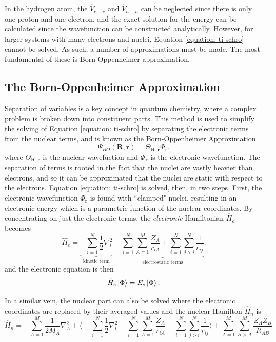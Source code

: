 In the hydrogen atom, the $\hat{V}_{e-e}$ and $\hat{V}_{n-n}$ can be neglected since there is only one proton and one electron, and the exact solution for the energy can be calculated since the wavefunction can be constructed analytically. However, for larger systems with many electrons and nuclei, Equation \ref{equation: ti-schro} cannot be solved. As such, a number of approximations must be made. The most fundamental of these is Born-Oppenheimer approximation.
\subsection{The Born-Oppenheimer Approximation}\label{section: QM_bornoppenheimer}
Separation of variables is a key concept in quantum chemistry, where a complex problem is broken down into constituent parts. This method is used to simplify the solving of Equation \ref{equation: ti-schro} by separating the electronic terms from the nuclear terms, and is known as the Born-Oppenheimer Approximation\cite{Born1927}
\begin{equation}
    \Psi_{BO}(\bm{R},\bm{r})=\Theta_{\bm{R},\bm{r}}\Phi_{\bm{r}}.
\end{equation}
where $\Theta_{\bm{R},\bm{r}}$ is the nuclear wavefuction and $\Phi_{\bm{r}}$ is the electronic wavefunction. The separation of terms is rooted in the fact that the nuclei are vastly heavier than electrons, and so it can be approximated that the nuclei are static with respect to the electrons. Equation \ref{equation: ti-schro} is solved, then, in two steps. First, the electronic wavefunction $\Phi_{\bm{r}}$ is found with ``clamped" nuclei, resulting in an electronic energy which is a parametric function of the nuclear coordinates. By concentrating on just the electronic terms, the \textit{electronic} Hamiltonian $\hat{H}_{e}$ becomes
\begin{equation}\label{equation: Hel}
     \hat{H}_{e}=\underbrace{-\sum_{i=1}^{N}\frac{1}{2}\nabla_{i}^2}_\text{kinetic term}-\underbrace{\sum_{i=1}^{N}\sum_{A=1}^{M}\frac{Z_{A}}{r_{iA}}+\sum_{i=1}^{N}\sum_{j>{i}}^{N}\frac{1}{r_{ij}}}_\text{electrostatic terms}.
\end{equation}
and the electronic \schro{} equation is then
\begin{equation}\label{equation: ti-schro-el}
   \hat{H}_{e}\ket{\Phi}=E_{e}\ket{\Phi}.
\end{equation}

In a similar vein, the nuclear part can also be solved where the electronic coordinates are replaced by their averaged values and the nuclear Hamilton $\hat{H}_{n}$ is\cite{szabo1996}
\begin{equation}
    \hat{H}_{n}=-\sum_{A=1}^{M}\frac{1}{2M_{A}}\nabla{}^{2}_{A}+\bigg\langle-\sum_{i=1}^{N}\frac{1}{2}\nabla^{2}_{i}-\sum_{i=1}^{N}\sum_{A=1}^{M}\frac{Z_{A}}{r_{iA}}+\sum_{i=1}^{N}\sum_{j>{i}}^{N}\frac{1}{r_{ij}}\bigg\rangle+\sum_{A=1}^{M}\sum_{B>A}^{M}\frac{Z_{A}Z_{B}}{R_{AB}}
\end{equation}

